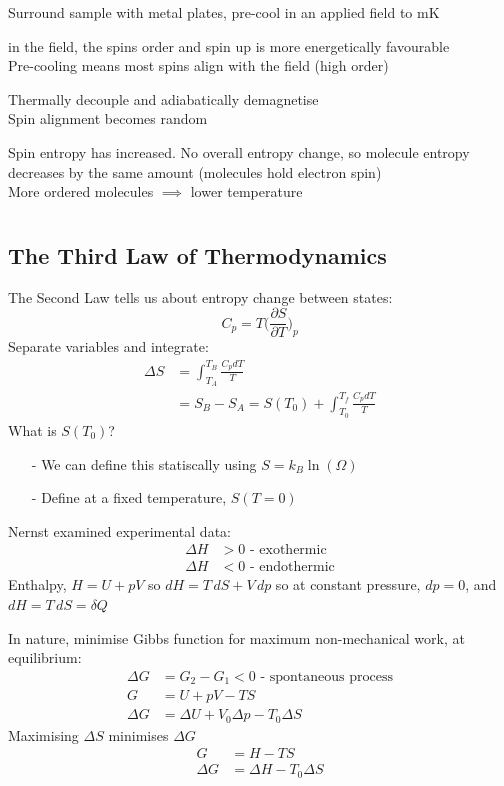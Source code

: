 \documentclass[a4paper, 11pt, normalem]{report}
\newcommand\p{\partial}
\begin{document}
Surround sample with metal plates, pre-cool in an applied field to mK

in the field, the spins order and spin up is more energetically favourable \\
Pre-cooling means most spins align with the field (high order)

Thermally decouple and adiabatically demagnetise \\
Spin alignment becomes random

Spin entropy has increased. No overall entropy change, so molecule entropy decreases by the same amount (molecules hold electron spin) \\
More ordered molecules $\implies$ lower temperature

\chapter{}
\section{The Third Law of Thermodynamics}
The Second Law tells us about entropy change between states:
\begin{equation*}
    C_p = T\Big(\frac{\p S}{\p T}\Big)_p
\end{equation*}
Separate variables and integrate:
\begin{align*}
    \Delta S &= \int_{T_A}^{T_B} \frac{C_p dT}{T} \\
    &= S_B - S_A = S(T_0) + \int_{T_0}^{T_f} \frac{C_p dT}{T}
\end{align*}
What is $S(T_0)$?
\begin{itemize}
    \item[-] We can define this statiscally using $S = k_B \ln(\Omega)$
    \item[-] Define at a fixed temperature, $S(T = 0)$
\end{itemize}
Nernst examined experimental data:
\begin{align*}
    \Delta H &> 0 \text{ - exothermic} \\
    \Delta H &< 0 \text{ - endothermic}
\end{align*}
Enthalpy, $H = U + pV$ so $dH = T\,dS + V\,dp$ so at constant pressure, $dp = 0$, and $dH = T\,dS = \delta Q$

In nature, minimise Gibbs function for maximum non-mechanical work, at equilibrium:
\begin{align*}
    \Delta G &= G_2 - G_1 < 0 \text{ - spontaneous process} \\
    G &= U + pV - TS \\
    \Delta G &= \Delta U + V_0 \Delta p - T_0 \Delta S
\end{align*}
Maximising $\Delta S$ minimises $\Delta G$
\begin{align*}
    G &= H - TS \\
    \Delta G &= \Delta H - T_0 \Delta S
\end{align*}
\end{document}
